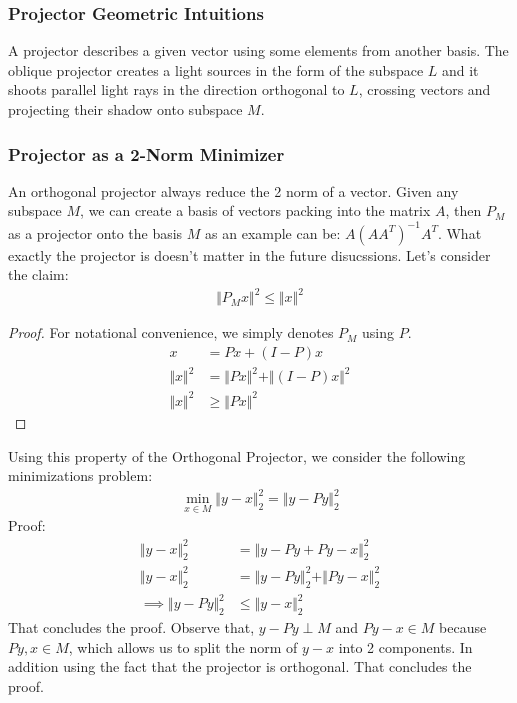 \documentclass[]{article}
\theoremstyle{definition}
\begin{document}
            \subsubsection{Projector Geometric Intuitions}
                A projector describes a given vector using some elements from another basis. The oblique projector creates a light sources in the form of the subspace $L$ and it shoots parallel light rays in the direction orthogonal to $L$, crossing vectors and projecting their shadow onto subspace $M$. 
        \subsubsection{Projector as a 2-Norm Minimizer}
            An orthogonal projector always reduce the 2 norm of a vector. Given any subspace $M$, we can create a basis of vectors packing into the matrix $A$, then $P_M$ as a projector onto the basis $M$ as an example can be: $A(AA^T)^{-1}A^T$. What exactly the projector is doesn't matter in the future disucssions. Let's consider the claim: 
            \begin{align}
                \Vert P_Mx\Vert^2 \le \Vert x\Vert^2
            \end{align}
            \begin{proof}
                For notational convenience, we simply denotes $P_M$ using $P$. 
                \begin{align}
                    x &= Px + (I - P)x 
                    \\
                    \Vert x\Vert^2 &= \Vert Px\Vert^2 + \Vert (I - P)x\Vert^2
                    \\
                    \Vert x\Vert^2 &\ge \Vert Px\Vert^2
                \end{align}    
            \end{proof}
            Using this property of the Orthogonal Projector, we consider the following minimizations problem: 
            \begin{align}
                \min_{x\in M} \Vert y - x\Vert_2^2 = \Vert y - Py\Vert_2^2
            \end{align}
            Proof:
            \begin{align}
                \Vert y - x\Vert_2^2 &= 
                \Vert y - Py + Py - x\Vert_2^2
                \\
                \Vert y - x\Vert_2^2 &= 
                \Vert y - Py\Vert_2^2 + \Vert Py - x\Vert_2^2
                \\
                \implies 
                \Vert y - Py\Vert_2^2 &\le \Vert y - x\Vert_2^2
            \end{align}
            That concludes the proof. Observe that, $y - Py\perp M$ and $Py - x \in M$ because $Py, x \in M$, which allows us to split the norm of $y - x$ into 2 components. In addition using the fact that the projector is orthogonal. That concludes the proof. 
\end{document}
